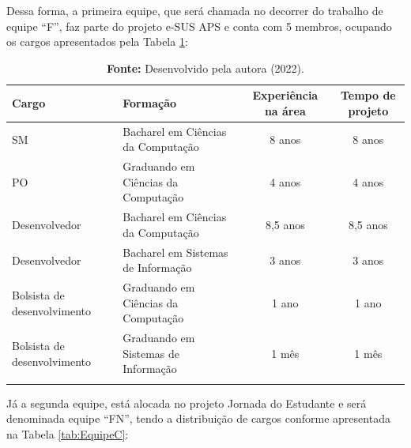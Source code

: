 \documentclass[
    12pt,       %
    openright,      %
    twoside,      %
    a4paper,      %
    english,      %
    french,       %
    spanish,      %
    brazil,       %
    ]{abntex2}
\begin{document}
Dessa forma, a primeira equipe, que será chamada no decorrer do trabalho de equipe ``F'', faz parte do projeto e-SUS APS e conta com 5 membros, ocupando os cargos apresentados pela Tabela \ref{tab:EquipeF}:

\begin{longtable}{|p{4cm}|p{4cm}|c|c|}
    \caption{Membros da equipe ``F''}
    \label{tab:EquipeF}
    \centering
            \centering
            \hline \rowcolor{lightgray}
            \textbf{Cargo} & \textbf{Formação} & \textbf{Experiência na área} & \textbf{Tempo de projeto} 
            \\ \hline 
            SM & Bacharel em Ciências da Computação & 8 anos & 8 anos
            \\ \hline
            PO & Graduando em Ciências da Computação & 4 anos & 4 anos 
            \\ \hline 
            Desenvolvedor & Bacharel em Ciências da Computação & 8,5 anos & 8,5 anos
            \\ \hline 
            Desenvolvedor & Bacharel em Sistemas de Informação & 3 anos & 3 anos
            \\ \hline 
            Bolsista de desenvolvimento & Graduando em Ciências da Computação & 1 ano & 1 ano
            \\ \hline 
            Bolsista de desenvolvimento & Graduando em Sistemas de Informação & 1 mês & 1 mês
            \\ \hline 
            \addlinespace[0.2cm]
            \caption*{\textbf{Fonte:} Desenvolvido pela autora (2022).}
\end{longtable}

Já a segunda equipe, está alocada no projeto Jornada do Estudante e será denominada equipe ``FN'', tendo a distribuição de cargos conforme apresentada na Tabela \ref{tab:EquipeC}:
\end{document}
